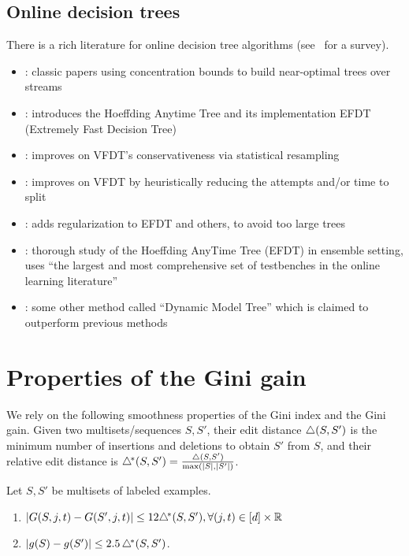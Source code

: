 \subsection{Online decision trees}
 There is a rich literature for online decision tree algorithms (see~\cite{Manapragada2022_AnEagerSplitting} for a survey).
\begin{itemize}
    \item \cite{Domingos2000_HighSpeedStreams,Domingos2001_MiningTimeSeries,Gama2003_HighSpeedStreams,Jin2003_EfficientDecisionTree,Rutkowski2013_DecisionTreesForMining}: classic papers using concentration bounds to build near-optimal trees over streams
    \item \cite{Manapragada2018_EFDT}: introduces the Hoeffding Anytime Tree and its implementation EFDT (Extremely Fast Decision Tree)
    \item \cite{Das2019_LearnSmartWithLess}: improves on VFDT's conservativeness via statistical resampling
   \item \cite{sun2020_SpeedingUpVeryFast}: improves on VFDT by heuristically reducing the attempts and/or time to split 
   \item \cite{Barddal20}: adds regularization to EFDT and others, to avoid too large trees
   \item \cite{Manapragada2022_AnEagerSplitting}: thorough study of the Hoeffding AnyTime Tree (EFDT) in ensemble setting, uses ``the largest and most comprehensive set of testbenches in the online learning literature''
   \item \cite{Haug2022_DynamicModelTree}: some other method called ``Dynamic Model Tree'' which is claimed to outperform previous methods
\end{itemize}

\section{Properties of the Gini gain}
We rely on the following smoothness properties of the Gini index and the Gini gain. Given two multisets/sequences $S,S'$, their edit distance $\triangle(S,S')$ is the minimum number of insertions and deletions to obtain $S'$ from $S$, and their relative edit distance is $\triangle^{\!*}(S,S') = \frac{\triangle(S,S')}{\max(|S|,|S'|)}$. 
\begin{lemma}
\label{lem:smoothness}
Let $S,S'$ be multisets of labeled examples.
\begin{enumerate}%
    \item $|G(S,j,t) - G(S',j,t)| \le 12 \triangle^{\!*}(S,S'), \forall (j,t) \in [d] \times \mathbb{R}$
    \item $|g(S)-g(S')| \le 2.5 \, \triangle^{\!*}(S,S')$.
\end{enumerate}
\end{lemma}


